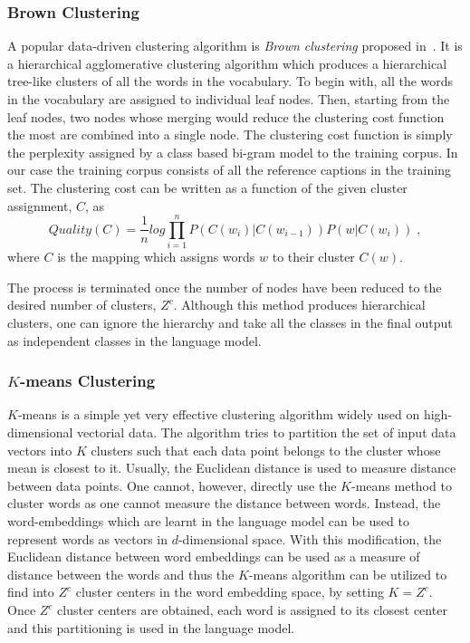 \subsubsection*{Brown Clustering}
A popular data-driven clustering algorithm is \emph{Brown clustering} proposed
in~\cite{BrownClust}.
It is a hierarchical agglomerative clustering algorithm which produces a hierarchical
tree-like clusters of all the words in the vocabulary.
To begin with, all the words in the vocabulary are assigned to individual leaf
nodes. 
Then, starting from the leaf nodes, two nodes whose merging would reduce the
clustering cost function the most are combined into a single node.
The clustering cost function is simply the perplexity assigned by a class based
bi-gram model to the training corpus. 
In our case the training corpus consists of all the reference captions in the
training set.
The clustering cost can be written as a function of the given cluster
assignment, $C$, as 
\begin{equation}
  \label{eq:brown} 
        Quality(C) = \frac{1}{n} log \prod_{i=1}^{n} P(C(w_i)|C(w_{i-1})) P(w|C(w_i)) \; ,
\end{equation}
\noindent where $C$ is the mapping which assigns words $w$ to their cluster
$C(w)$.

The process is terminated once the number of nodes have been reduced to the
desired number of clusters, $Z^c$.
Although this method produces hierarchical clusters, one can ignore the
hierarchy and take all the classes in the final output as independent classes in
the language model. 
\subsubsection*{$K$-means Clustering}

$K$-means is a simple yet very effective clustering algorithm widely used on
high-dimensional vectorial data.
The algorithm tries to partition the set of input data vectors into $K$ clusters
such that each data point belongs to the cluster whose mean is closest to
it.
Usually, the Euclidean distance is used to measure distance between data points.
One cannot, however, directly use the $K$-means method to cluster words as one
cannot measure the distance between words.
Instead, the word-embeddings which are learnt in the language model can be used
to represent words as vectors in $d$-dimensional space.
With this modification, the Euclidean distance between word embeddings can be
used as a measure of distance between the words and thus the $K$-means algorithm
can be utilized to find into $Z^c$ cluster centers in the word embedding space,
by setting $K=Z^c$.
Once $Z^c$ cluster centers are obtained, each word is assigned to its closest
center and this partitioning is used in the language model.

